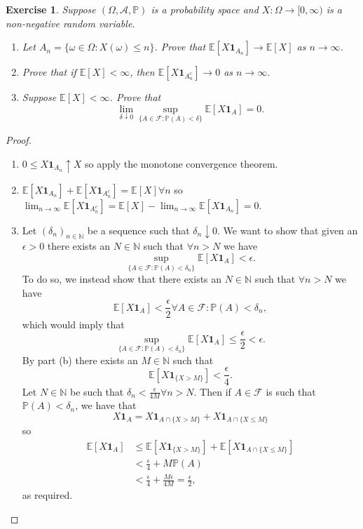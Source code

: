 \documentclass{article}
\newtheorem{exercise}[theorem]{Exercise}
\begin{document}
\begin{exercise}
Suppose $(\Omega,\mathcal{A},\mathbb{P})$ is a probability space and $X:\Omega\to[0,\infty)$ is a non-negative random variable.
\begin{enumerate}
    \item[(a)] Let $A_n=\{\omega\in\Omega:X(\omega)\leq n\}$. Prove that $\mathbb{E}[X\mathbf{1}_{A_n
    }]\to\mathbb{E}[X]$ as $n\to\infty$.
    \item[(b)] Prove that if $\mathbb{E}[X]<\infty$, then $\mathbb{E}[X\mathbf{1}_{A_n^c}]\to0$ as $n\to\infty$.
    \item[(c)] Suppose $\mathbb{E}[X]<\infty$. Prove that\[\lim_{\delta\downarrow0}\sup_{\{A\in\mathcal{F}:\mathbb{P}(A)<\delta\}}\mathbb{E}[X\mathbf{1}_A]=0.\]
\end{enumerate}
\end{exercise}
\begin{proof}
\begin{enumerate}
    \item[(a)] $0\leq X\mathbf{1}_{A_n}\uparrow X$ so apply the monotone convergence theorem.
    \item[(b)] $\mathbb{E}[X\mathbf{1}_{A_n}]+\mathbb{E}[X\mathbf{1}_{A_n^c}]=\mathbb{E}[X]\forall n$ so $\lim_{n\to\infty}\mathbb{E}[X\mathbf{1}_{A_n^c}]=\mathbb{E}[X]-\lim_{n\to\infty}\mathbb{E}[X\mathbf{1}_{A_n}]=0$.
    \item[(c)] Let $(\delta_n)_{n\in\mathbb{N}}$ be a sequence such that $\delta_n\downarrow0$. We want to show that given an $\epsilon > 0$ there exists an $N\in\mathbb{N}$ such that $\forall n>N$ we have\[\sup_{\{A\in\mathcal{F}:\mathbb{P}(A)<\delta_n\}}\mathbb{E}[X\mathbf{1}_A]<\epsilon.\] To do so, we instead show that there exists an $N\in\mathbb{N}$ such that $\forall n>N$ we have\[\mathbb{E}[X\mathbf{1}_A]<\frac{\epsilon}{2}\forall A\in\mathcal{F}:\mathbb{P}(A)<\delta_n,\] which would imply that \[\sup_{\{A\in\mathcal{F}:\mathbb{P}(A)<\delta_n\}}\mathbb{E}[X\mathbf{1}_A]\leq\frac{\epsilon}{2}<\epsilon.\] By part (b) there exists an $M\in\mathbb{N}$ such that \[\mathbb{E}[X\mathbf{1}_{\{ X>M\}}]<\frac{\epsilon}{4}.\] Let $N\in\mathbb{N}$ be such that $\delta_n<\frac{\epsilon}{4M}\forall n>N$. Then if $A\in\mathcal{F}$ is such that $\mathbb{P}(A)<\delta_n$, we have that\[X\mathbf{1}_A=X\mathbf{1}_{A\cap \{X>M\}}+X\mathbf{1}_{A\cap \{X\leq M\}}\]so\begin{align*}\mathbb{E}[X\mathbf{1}_A]&\leq \mathbb{E}[X\mathbf{1}_{\{X>M\}}]+\mathbb{E}[X\mathbf{1}_{A\cap\{X\leq M\}}]\\&<\frac{\epsilon}{4}+M\mathbb{P}(A)\\&<\frac{\epsilon}{4}+\frac{M\epsilon}{4M}=\frac{\epsilon}{2},\end{align*} as required.
\end{enumerate}
\end{proof}
\end{document}

